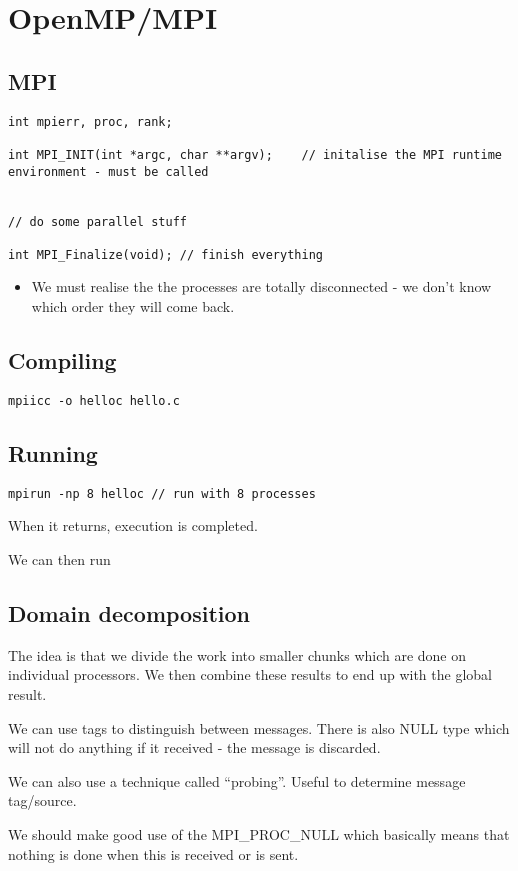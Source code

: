 \chapter{OpenMP/MPI}

\section{MPI}

\begin{verbatim}
int mpierr, proc, rank;

int MPI_INIT(int *argc, char **argv);	 // initalise the MPI runtime environment - must be called


// do some parallel stuff

int MPI_Finalize(void);	// finish everything
\end{verbatim}

\begin{itemize}
\item We must realise the the processes are totally disconnected - we don't know which order they will come back. 
\end{itemize}

\section{Compiling}

\begin{verbatim}
mpiicc -o helloc hello.c
\end{verbatim}

\section{Running}

\begin{verbatim}
mpirun -np 8 helloc // run with 8 processes
\end{verbatim}

When it returns, execution is completed.

We can then run  

\section{Domain decomposition}

The idea is that we divide the work into smaller chunks which are done on individual processors. We then combine these results to end up with the global result. 

We can use tags to distinguish between messages. There is also NULL type which will not do anything if it received - the message is discarded. 

We can also use a technique called ``probing''. Useful to determine message tag/source.

We should make good use of the MPI_PROC_NULL which basically means that nothing is done when this is received or is sent. 


